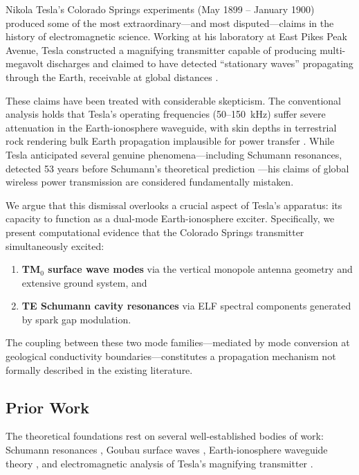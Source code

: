 \documentclass[12pt,a4paper]{article}
\begin{document}
Nikola Tesla's Colorado Springs experiments (May 1899 -- January 1900) produced some of the most extraordinary---and most disputed---claims in the history of electromagnetic science. Working at his laboratory at East Pikes Peak Avenue, Tesla constructed a magnifying transmitter capable of producing multi-megavolt discharges and claimed to have detected ``stationary waves'' propagating through the Earth, receivable at global distances \citep{tesla1978,tesla1905}.

These claims have been treated with considerable skepticism. The conventional analysis holds that Tesla's operating frequencies (50--150~kHz) suffer severe attenuation in the Earth-ionosphere waveguide, with skin depths in terrestrial rock rendering bulk Earth propagation implausible for power transfer \citep{jackson1999}. While Tesla anticipated several genuine phenomena---including Schumann resonances, detected 53 years before Schumann's theoretical prediction \citep{schumann1952}---his claims of global wireless power transmission are considered fundamentally mistaken.

We argue that this dismissal overlooks a crucial aspect of Tesla's apparatus: its capacity to function as a dual-mode Earth-ionosphere exciter. Specifically, we present computational evidence that the Colorado Springs transmitter simultaneously excited:
\begin{enumerate}
    \item \textbf{TM$_0$ surface wave modes} via the vertical monopole antenna geometry and extensive ground system, and
    \item \textbf{TE Schumann cavity resonances} via ELF spectral components generated by spark gap modulation.
\end{enumerate}
The coupling between these two mode families---mediated by mode conversion at geological conductivity boundaries---constitutes a propagation mechanism not formally described in the existing literature.

\subsection{Prior Work}

The theoretical foundations rest on several well-established bodies of work: Schumann resonances \citep{schumann1952,balser1960,price2016}, Goubau surface waves \citep{sommerfeld1909,goubau1950}, Earth-ionosphere waveguide theory \citep{wait1962,galejs1972}, and electromagnetic analysis of Tesla's magnifying transmitter \citep{corum2001}.
\end{document}

